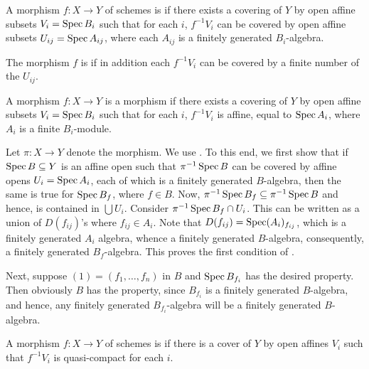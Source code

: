 \begin{lemma}
    
\end{lemma}

\begin{definition}
    A morphism $f: X\to Y$ of schemes is  if there exists a covering of $Y$ by open affine subsets $V_i = \operatorname{Spec} B_i$ such that for each $i$, $f^{-1}V_i$ can be covered by open affine subsets $U_{ij} = \operatorname{Spec} A_{ij}$, where each $A_{ij}$ is a finitely generated $B_i$-algebra.

    The morphism $f$ is  if in addition each $f^{-1}V_i$ can be covered by a finite number of the $U_{ij}$.
\end{definition}

\begin{definition}
    A morphism $f: X\to Y$ is a  morphism if there exists a covering of $Y$ by open affine subsets $V_i = \operatorname{Spec} B_i$ such that for each $i$, $f^{-1}V_i$ is affine, equal to $\operatorname{Spec} A_i$, where $A_i$ is a finite $B_i$-module.
\end{definition}

\begin{exercise} %
    Let $\pi: X\to Y$ denote the morphism. We use . To this end, we first show that if $\operatorname{Spec} B\subseteq Y$ is an affine open such that $\pi^{-1}\operatorname{Spec} B$ can be covered by affine opens $U_i = \operatorname{Spec} A_i$, each of which is a finitely generated $B$-algebra, then the same is true for $\operatorname{Spec} B_f$, where $f\in B$. Now, $\pi^{-1}\operatorname{Spec} B_f\subseteq\pi^{-1}\operatorname{Spec} B$ and hence, is contained in $\bigcup U_i$. Consider $\pi^{-1}\operatorname{Spec} B_f\cap U_i$. This can be written as a union of $D(f_{ij})$'s where $f_{ij}\in A_{i}$. Note that $D(f_{ij}) = \operatorname{Spec} (A_i)_{f_{ij}}$, which is a finitely generated $A_i$ algebra, whence a finitely generated $B$-algebra, consequently, a finitely generated $B_f$-algebra. This proves the first condition of .

    Next, suppose $(1) = (f_1,\dots, f_n)$ in $B$ and $\operatorname{Spec} B_{f_i}$ has the desired property. Then obviously $B$ has the property, since $B_{f_i}$ is a finitely generated $B$-algebra, and hence, any finitely generated $B_{f_i}$-algebra will be a finitely generated $B$-algebra.
\end{exercise}

\begin{definition}
    A morphism $f: X\to Y$ of schemes is  if there is a cover of $Y$ by open affines $V_i$ such that $f^{-1}V_i$ is quasi-compact for each $i$.
\end{definition}

